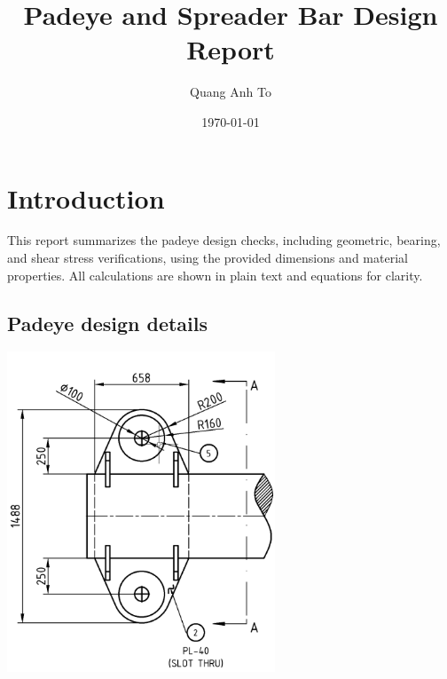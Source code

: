 \documentclass[12pt]{article}
\title{Padeye and Spreader Bar Design Report}
\author{Quang Anh To}
\date{\today}
\begin{document}
\maketitle

\tableofcontents

\pagebreak
\section{Introduction}
This report summarizes the padeye design checks, including geometric, bearing, and shear stress verifications, using the provided dimensions and material properties. All calculations are shown in plain text and equations for clarity.

\subsection*{Padeye design details}
\begin{center}
\includegraphics[width=0.6\textwidth]{image-1.png}
\end{center}
\end{document}
